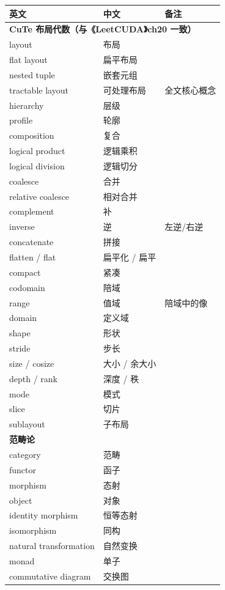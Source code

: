 \begin{longtable}{@{}lll@{}}
\toprule
英文 & 中文 & 备注 \\
\midrule
\endhead
\multicolumn{3}{l}{\textbf{CuTe 布局代数（与《LeetCUDA》ch20 一致）}} \\
layout & 布局 & \\
flat layout & 扁平布局 & \\
nested tuple & 嵌套元组 & \\
tractable layout & 可处理布局 & 全文核心概念 \\
hierarchy & 层级 & \\
profile & 轮廓 & \\
composition & 复合 & \\
logical product & 逻辑乘积 & \\
logical division & 逻辑切分 & \\
coalesce & 合并 & \\
relative coalesce & 相对合并 & \\
complement & 补 & \\
inverse & 逆 & 左逆/右逆 \\
concatenate & 拼接 & \\
flatten / flat & 扁平化 / 扁平 & \\
compact & 紧凑 & \\
codomain & 陪域 & \\
range & 值域 & 陪域中的像 \\
domain & 定义域 & \\
shape & 形状 & \\
stride & 步长 & \\
size / cosize & 大小 / 余大小 & \\
depth / rank & 深度 / 秩 & \\
mode & 模式 & \\
slice & 切片 & \\
sublayout & 子布局 & \\
\midrule
\multicolumn{3}{l}{\textbf{范畴论}} \\
category & 范畴 & \\
functor & 函子 & \\
morphism & 态射 & \\
object & 对象 & \\
identity morphism & 恒等态射 & \\
isomorphism & 同构 & \\
natural transformation & 自然变换 & \\
monad & 单子 & \\
commutative diagram & 交换图 & \\

\end{longtable}
